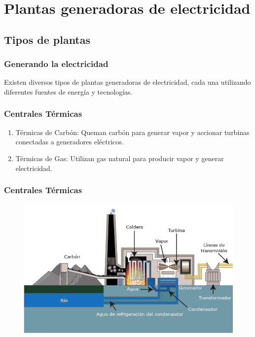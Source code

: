 \documentclass[14pt]{beamer}
\begin{document}
\section{Plantas generadoras de electricidad}
\subsection{Tipos de plantas}


\begin{frame}
\frametitle{Generando la electricidad}
Existen diversos tipos de plantas generadoras de electricidad, cada una utilizando diferentes fuentes de energía y tecnologías.
\end{frame}
\begin{frame}
\frametitle{Centrales Térmicas}
\begin{enumerate}[<+->]
\item Térmicas de Carbón: Queman carbón para generar vapor y accionar turbinas conectadas a generadores eléctricos.
\item Térmicas de Gas: Utilizan gas natural para producir vapor y generar electricidad.
\end{enumerate}
\end{frame}
\begin{frame}
\frametitle{Centrales Térmicas}
\vspace*{-1cm}
\begin{figure}
    \centering
    \includegraphics[scale=1.5]{Imagenes/Planta_Termica_01.png}
\end{figure}
\end{frame}
\end{document}
